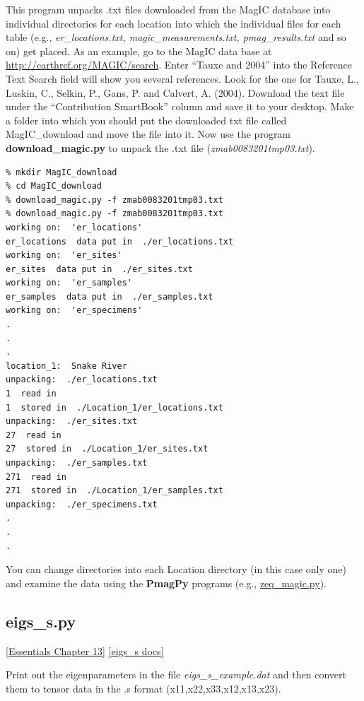 \documentclass[11pt]{book}
\begin{document}
{{ This program unpacks .txt files downloaded from the MagIC database into individual directories for each location into which the individual files for each table (e.g., {\it er\_locations.txt, magic\_measurements.txt, pmag\_results.txt} and so on) get placed.   As an example, go to the MagIC data base at \url{http://earthref.org/MAGIC/search}.  Enter ``Tauxe and 2004'' into the Reference Text Search field will show you several references.   Look for the one for Tauxe, L., Luskin, C., Selkin, P., Gans, P. and Calvert, A. (2004). \nocite{tauxe04b}  Download the  text file under the ``Contribution SmartBook'' column and save it to your desktop.   Make a   folder into which  you should put the downloaded txt file called MagIC\_download and move the file into it.  Now use the program {\bf download\_magic.py} to unpack the .txt file ({\it zmab0083201tmp03.txt}).

 \begin{verbatim}
% mkdir MagIC_download
% cd MagIC_download
% download_magic.py -f zmab0083201tmp03.txt
% download_magic.py -f zmab0083201tmp03.txt
working on:  'er_locations'
er_locations  data put in  ./er_locations.txt
working on:  'er_sites'
er_sites  data put in  ./er_sites.txt
working on:  'er_samples'
er_samples  data put in  ./er_samples.txt
working on:  'er_specimens'
.
.
.
location_1:  Snake River
unpacking:  ./er_locations.txt
1  read in
1  stored in  ./Location_1/er_locations.txt
unpacking:  ./er_sites.txt
27  read in
27  stored in  ./Location_1/er_sites.txt
unpacking:  ./er_samples.txt
271  read in
271  stored in  ./Location_1/er_samples.txt
unpacking:  ./er_specimens.txt
.
.
.
\end{verbatim}

You can change directories into each Location directory (in this case only one) and examine the data using the {\bf PmagPy} programs (e.g., \href{#zeq_magic.py}{zeq\_magic.py}).


\subsection{eigs\_s.py}
\href{http://earthref.org/MAGIC/books/Tauxe/Essentials/WebBook3ch13.html#ch13}{ [Essentials Chapter 13]}
\href{https://github.com/PmagPy/PmagPy/blob/master/programs/eigs_s.py}{[eigs\_s docs]}

Print out the eigenparameters  in the file {\it eigs\_s\_example.dat} and then
convert them to tensor data in the .s format (x11,x22,x33,x12,x13,x23).

}}
\end{document}
